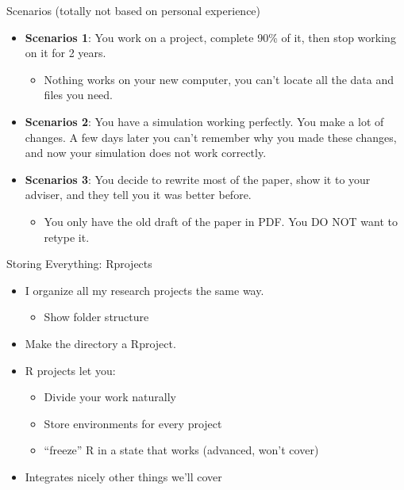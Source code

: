 \documentclass[ignorenonframetext,]{beamer}
\providecommand{\tightlist}{%
  \setlength{\itemsep}{0pt}\setlength{\parskip}{0pt}}
\begin{document}
\begin{frame}{Scenarios (totally not based on personal experience)}
\protect\hypertarget{scenarios-totally-not-based-on-personal-experience}{}

\begin{itemize}
\item
  \textbf{Scenarios 1}: You work on a project, complete 90\% of it, then
  stop working on it for 2 years.

  \begin{itemize}
  \tightlist
  \item
    \alert{Nothing works} on your new computer, you can’t locate all the
    data and files you need.
  \end{itemize}
\item
  \textbf{Scenarios 2}: You have a simulation working perfectly. You
  make a lot of changes. \alert{A few days later} you can’t remember why
  you made these changes, and now
  \alert{your simulation does not work correctly}.
\item
  \textbf{Scenarios 3}: You decide to rewrite most of the paper, show it
  to your adviser, and they tell you it was better before.

  \begin{itemize}
  \tightlist
  \item
    You only have the old draft of the paper in PDF. You DO NOT want to
    retype it.
  \end{itemize}
\end{itemize}

\end{frame}

\begin{frame}{Storing Everything: Rprojects}
\protect\hypertarget{storing-everything-rprojects}{}

\begin{itemize}
\item
  I organize all my research projects the same way.

  \begin{itemize}
  \tightlist
  \item
    Show folder structure
  \end{itemize}
\item
  Make the directory a Rproject.
\item
  R projects let you:

  \begin{itemize}
  \tightlist
  \item
    Divide your work naturally
  \item
    Store environments for every project
  \item
    “freeze” R in a state that works (advanced, won’t cover)
  \end{itemize}
\item
  Integrates nicely other things we’ll cover
\end{itemize}

\end{frame}
\end{document}
